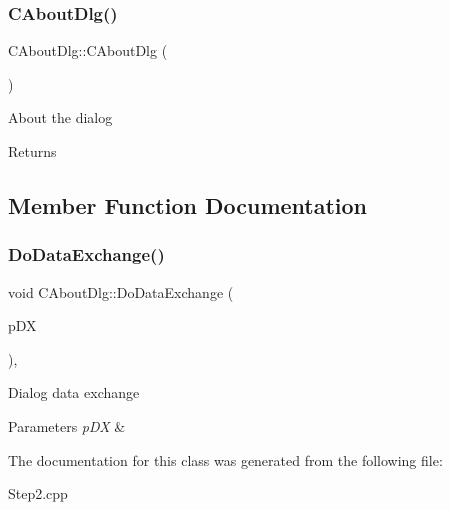 \subsubsection{\texorpdfstring{C\+About\+Dlg()}{CAboutDlg()}}
{\footnotesize\ttfamily C\+About\+Dlg\+::\+C\+About\+Dlg (\begin{DoxyParamCaption}{ }\end{DoxyParamCaption})\hspace{0.3cm}{\ttfamily [noexcept]}}

About the dialog \begin{DoxyReturn}{Returns}

\end{DoxyReturn}


\subsection{Member Function Documentation}
\mbox{\label{class_c_about_dlg_ab83db7484fec957282d7d5a21aed4df4}} 
\subsubsection{\texorpdfstring{Do\+Data\+Exchange()}{DoDataExchange()}}
{\footnotesize\ttfamily void C\+About\+Dlg\+::\+Do\+Data\+Exchange (\begin{DoxyParamCaption}\item[{C\+Data\+Exchange $\ast$}]{p\+DX }\end{DoxyParamCaption})\hspace{0.3cm}{\ttfamily [protected]}, {\ttfamily [virtual]}}

Dialog data exchange 
\begin{DoxyParams}{Parameters}
{\em p\+DX} & \\
\hline
\end{DoxyParams}


The documentation for this class was generated from the following file\+:\begin{DoxyCompactItemize}
\item 
Step2.\+cpp\end{DoxyCompactItemize}
